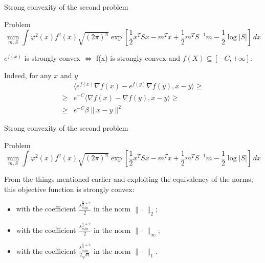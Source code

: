 \documentclass[10pt]{beamer}
\begin{document}
\begin{frame}{Strong convexity of the second problem}
\begin{block}{Problem}
\[
\min_{m,S} \int \varphi^2(x)f^2(x) \sqrt{(2\pi)^n} \exp \left[\frac12 x^TSx - m^Tx + \frac12 m^T S^{-1}m - \frac 12 \log |S|  \right] \, dx
\]
\end{block}

$e^{f(x)}$ is strongly convex $\Leftrightarrow$ f(x) is strongly convex and $f(X) \subseteq [-C, + \infty]$.

Indeed, for any $x$ and $y$
\begin{align*}
    &\langle e^{f(x)} \nabla f(x) - e^{f(y)} \nabla f(y), x-y \rangle \geq\\ 
    \geq & e^{-C} \langle \nabla f(x) - \nabla f(y), x-y \rangle \geq \\
    \geq & e^{-C} \beta \|x-y\|^2
\end{align*}

\end{frame}



\begin{frame}{Strong convexity of the second problem}
\begin{block}{Problem}
\[
\min_{m,S} \int \varphi^2(x)f^2(x) \sqrt{(2\pi)^n} \exp \left[\frac12 x^TSx - m^Tx + \frac12 m^T S^{-1}m - \frac 12 \log |S|  \right] \, dx
\]
\end{block}

From the things mentioned earlier and exploiting the equivalency of the norms, this objective function is strongly convex:
\begin{itemize}
\item with the coefficient $\frac{\lambda_{min}^{\frac n2+ 2}}{2}$ in the norm $\|\cdot\|_2$;
\item with the coefficient $\frac{\lambda_{min}^{\frac n2 + 2}}{2}$ in the norm $\|\cdot\|_{\infty}$;
\item with the coefficient $\frac{\lambda_{min}^{\frac n2 + 2}}{2 \sqrt{n}}$ in the norm $\|\cdot\|_{1}$.

\end{itemize}
\end{frame}
\end{document}
